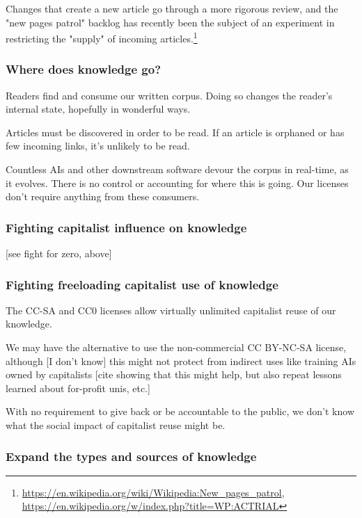 \documentclass[format=sigconf, authorversion]{acmart}
\begin{document}
Changes that create a new article go through a more rigorous review, and the "new pages patrol" backlog has recently been the subject of an experiment in restricting the "supply" of incoming articles.\footnote{\url{https://en.wikipedia.org/wiki/Wikipedia:New_pages_patrol}, \url{https://en.wikipedia.org/w/index.php?title=WP:ACTRIAL}}

\subsubsection{Where does knowledge go?}

Readers find and consume our written corpus.  Doing so changes the reader's internal state, hopefully in wonderful ways.

Articles must be discovered in order to be read.  If an article is orphaned or has few incoming links, it's unlikely to be read.

Countless AIs and other downstream software devour the corpus in real-time, as it evolves.  There is no control or accounting for where this is going.  Our licenses don't require anything from these consumers.

\subsubsection{Fighting capitalist influence on knowledge}

[see fight for zero, above]

\subsubsection{Fighting freeloading capitalist use of knowledge}

The CC-SA and CC0 licenses allow virtually unlimited capitalist reuse of our knowledge.

We may have the alternative to use the non-commercial CC BY-NC-SA license, although [I don't know] this might not protect from indirect uses like training AIs owned by capitalists [cite showing that this might help, but also repeat lessons learned about for-profit unis, etc.]

With no requirement to give back or be accountable to the public, we don't know what the social impact of capitalist reuse might be.

\subsubsection{Expand the types and sources of knowledge}
\end{document}
